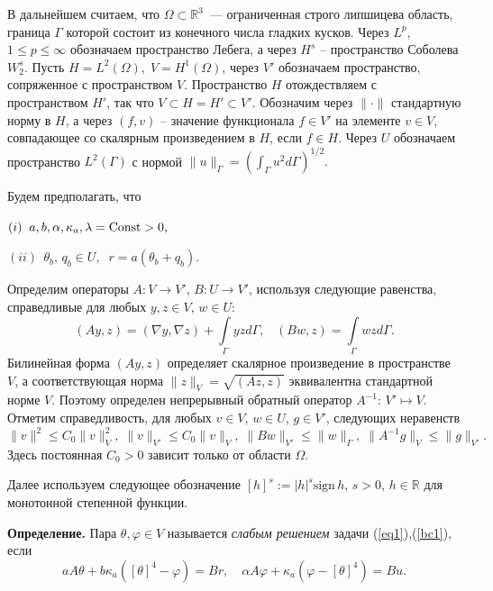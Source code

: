 \documentclass[12pt]{article}
\begin{document}
    В дальнейшем считаем, что $\Omega\subset \mathbb{R}^3$~--- ограниченная строго липшицева
    область, граница $\Gamma$ которой состоит из конечного числа
    гладких кусков.
    Через $L^p$, $1 \leq p \leq \infty$ обозначаем
    пространство Лебега, а через $H^s$ -- пространство Соболева
    $W^s_2$. Пусть $H = L^2(\Omega), \; V = H^1(\Omega)$, через $V'$ обозначаем
    пространство, сопряженное с пространством $V$. Пространство $H$
    отождествляем с пространством $H'$, так что $V \subset H = H'
    \subset V'$.
    Обозначим через $\|\cdot\|$ стандартную норму
    в $H$, а через
    $(f,v)$ -- значение функционала $f\in V'$ на элементе $v\in V$,
    совпадающее со скалярным произведением в $H$, если $f\in H$.
    Через $U$ обозначаем пространство $L^2(\Gamma)$ с нормой
    $\|u\|_\Gamma=\left(\int_\Gamma u^2d\Gamma\right)^{1/2}.$



    Будем предполагать, что

    $(i) \;\; a,b,\alpha,\kappa_a, \lambda
    ={\rm Const}> 0 ,$

    $(ii) \;\, \theta_b, \,q_b \in U,\;\; r=a(\theta_b+q_b).$


    Определим операторы $A\colon V \to V'$, $B\colon U \to V'$, используя
    следующие равенства, справедливые для любых $y,z \in V$, $w\in U$:
    $$
    (Ay,z) = (\nabla y, \nabla z) +
    \int\limits_{\Gamma}yz d\Gamma, \;\;\; (Bw, z)
    = \int\limits_{\Gamma}wz d\Gamma.
    $$
    Билинейная форма $(Ay,z)$ определяет скалярное произведение
    в пространстве $V$, а соответствующая норма $\|z\|_V=\sqrt{(Az,z)}$ эквивалентна
    стандартной норме $V$. Поэтому определен непрерывный обратный оператор
    $A^{-1}:\,V'\mapsto V.$ Отметим справедливость, для любых
    $v\in V$, $w\in U$, $g\in V'$,
    следующих неравенств
    \begin{equation}
        \label{E}
        \|v\|^2\leq C_0\|v\|^2_V,\; \|v\|_{V'}\leq C_0\|v\|_V,\; \|Bw\|_{V'}\leq \|w\|_\Gamma,\;
        \|A^{-1}g\|_{V}\leq \|g\|_{V'}.
    \end{equation}
    Здесь постоянная $C_0>0$ зависит только от области $\Omega.$




    Далее используем следующее обозначение
    $[h]^s := |h|^s \mathrm{sign}\, h$,
    $s > 0$, $h \in \mathbb R$ для монотонной степенной функции.


        {\bf Определение.} Пара $\theta, \varphi\in V$
    называется {\it слабым решением} задачи (\ref{eq1}),(\ref{bc1}), если
    \begin{equation}
        \label{w1}
        a A \theta + b \kappa_a ([\theta]^4 - \varphi ) = Br,\quad
        \alpha A \varphi + \kappa_a (\varphi - [\theta]^4)  = Bu.
    \end{equation}
\end{document}
